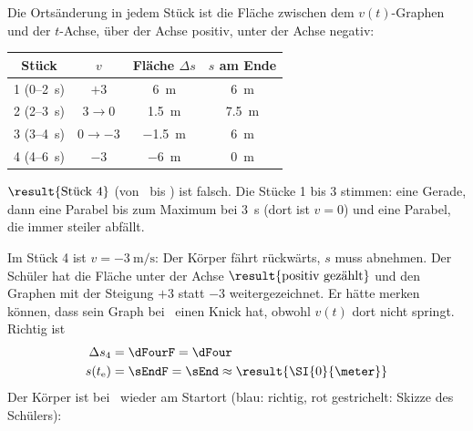 Die Ortsänderung in jedem Stück ist die Fläche zwischen dem $v(t)$-Graphen und der $t$-Achse, über der Achse positiv, unter der Achse negativ:
\begin{center}
\begin{tabular}{c|c|c|c}
Stück & $v$ & Fläche $\Delta s$ & $s$ am Ende \\
\hline
1 (0--\SI{2}{\second}) & $+3$ & \SI{6}{\meter} & \SI{6}{\meter} \\
2 (2--\SI{3}{\second}) & $3 \to 0$ & \SI{1.5}{\meter} & \SI{7.5}{\meter} \\
3 (3--\SI{4}{\second}) & $0 \to -3$ & \SI{-1.5}{\meter} & \SI{6}{\meter} \\
4 (4--\SI{6}{\second}) & $-3$ & \SI{-6}{\meter} & \SI{0}{\meter}
\end{tabular}
\end{center}
\begin{abcliste}
\abc $\result{\text{Stück 4}}$ (von \tThreeO\ bis \tEO) ist falsch. Die Stücke 1 bis 3 stimmen: eine Gerade, dann eine Parabel bis zum Maximum bei \SI{3}{\second} (dort ist $v = 0$) und eine Parabel, die immer steiler abfällt.

\abc Im Stück 4 ist $v = \SI{-3}{\meter\per\second}$: Der Körper fährt rückwärts, $s$ muss abnehmen. Der Schüler hat die Fläche unter der Achse $\result{\text{positiv gezählt}}$ und den Graphen mit der Steigung $+3$ statt $-3$ weitergezeichnet. Er hätte merken können, dass sein Graph bei \tThreeO\ einen Knick hat, obwohl $v(t)$ dort nicht springt. Richtig ist
\begin{align}
 \Delta s_4 &= \dFourF = \dFour \\
 s(t_\mathrm{e}) &= \sEndF = \sEnd \approx \result{\SI{0}{\meter}}
\end{align}
Der Körper ist bei \tEO\ wieder am Startort (blau: richtig, rot gestrichelt: Skizze des Schülers):
\begin{center}
\end{center}
\end{abcliste}

